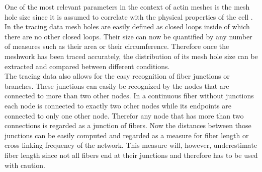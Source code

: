 \documentclass[12pt,english,twocolumn]{revtex4}
\begin{document}
One of the most relevant parameters in the context of actin meshes is the mesh hole size since it is assumed to correlate with the physical properties of the cell \cite{actin_gel_on_spherical_surface}. In the tracing data mesh holes are easily defined as closed loops inside of which there are no other closed loops. Their size can now be quantified by any number of measures such as their area or their circumference. Therefore once the meshwork has been traced accurately, the distribution of its mesh hole size can be extracted and compared between different conditions.\\

The tracing data also allows for the easy recognition of fiber junctions or branches. These junctions can easily be recognized by the nodes that are connected to more than two other nodes. In a continuous fiber without junctions each node is connected to exactly two other nodes while its endpoints are connected to only one other node. Therefor any node that has more than two connections is regarded as a junction of fibers. Now the distances between those junctions can be easily computed and regarded as a measure for fiber length or cross linking frequency of the network. This measure will, however, underestimate fiber length since not all fibers end at their junctions and therefore has to be used with caution.\\

\end{document}
